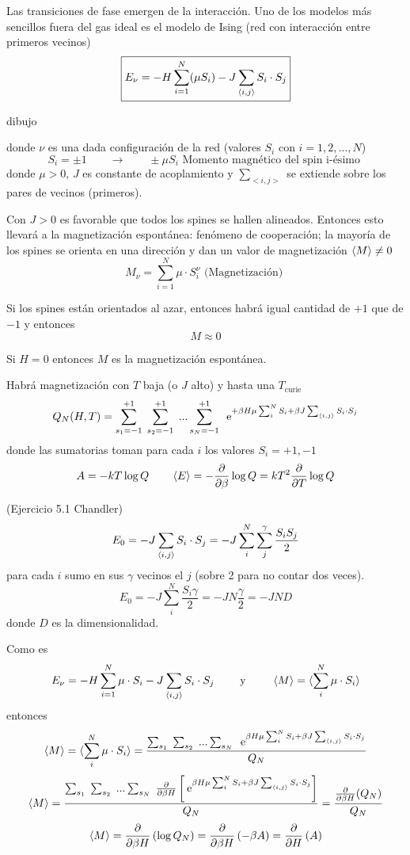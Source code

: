 \documentclass[10pt,oneside]{CBFT_book}
\begin{document}
Las transiciones de fase emergen de la interacción. Uno de los modelos más sencillos fuera del gas ideal es el modelo de
Ising (red con interacción entre primeros vecinos)
\[
	\boxed{ E_\nu = -H \sum_{i=1}^N (\mu S_i) - J \sum_{\braket{i,j}} S_i \cdot S_j }
	\label{energia_ising}
\]

dibujo 


donde $\nu$ es una dada configuración de la red (valores $S_i$ con $i=1,2,...,N$)
\[
	S_i = \pm 1 \qquad \rightarrow \qquad \pm \mu S_i \text{ Momento magnético del spin i-ésimo }
\]
donde $\mu>0$, $J$ es constante de acoplamiento y $\sum_{<i,j>}$ se extiende sobre los pares de vecinos (primeros).

Con $J>0$ es favorable que todos los spines se hallen alineados. Entonces esto llevará a la magnetización espontánea: 
fenómeno de cooperación; la mayoría de los spines se orienta en una dirección y dan un valor de magnetización 
$\braket{M} \neq 0$
\[
	M_\nu = \sum_{i=1}^N \mu \cdot S_i^\nu
	\text{ (Magnetización) }
\]

Si los spines están orientados al azar, entonces habrá igual cantidad de $+1$ que de $-1$ y entonces
\[
	M \approx 0
\]

Si $H=0$ entonces $M$ es la magnetización espontánea.

Habrá magnetización con $T$ baja (o $J$ alto) y hasta una $T_\text{curie}$
\[
	Q_N(H,T) = \sum_{s_1=-1}^{+1} \; \sum_{s_2=-1}^{+1} \; ... \sum_{s_N=-1}^{+1} \;
	\:\mathrm{e}^{ +\beta H \mu \sum_i^N S_i + \beta J \sum_{\braket{i,j}} S_i \cdot S_j }
\]
donde las sumatorias toman para cada $i$ los valores $S_i = +1, -1$
\[
	A = -kT\log Q \qquad \braket{E} = -\frac{\partial^{\hspace{-0.05em}} {}}{\partial {\beta}^{\hspace{-0.05em}}}\log Q = kT^2 \frac{\partial^{\hspace{-0.05em}} {}}{\partial {T}^{\hspace{-0.05em}}} \log Q
\]

\begin{ejemplillo}{(Ejercicio 5.1 Chandler)}
\[
	E_0 = -J \sum_{\braket{i,j}} S_i \cdot S_j = -J  \sum_i^N \sum_j^\gamma \frac{S_i S_j}{2}
\]
para cada $i$ sumo en sus $\gamma$ vecinos el $j$ (sobre 2 para no contar dos veces).
\[
	E_0 = -J \sum_i^N \frac{S_i\gamma}{2} = -J N\frac{\gamma}{2} = -JND
\]
donde $D$ es la dimensionalidad.
\end{ejemplillo}


Como es
\[
	E_\nu =  -H \sum_{i=1}^N \mu \cdot S_i - J \sum_{\braket{i,j}} S_i \cdot S_j \qquad
	\text{ y } \qquad \braket{M} = \braket{ \sum_i^N \mu \cdot S_i }
\]
entonces
\[
	\braket{M} = \braket{ \sum_i^N \mu \cdot S_i } = 
	\frac{ \sum_{s_1} \; \sum_{s_2} \; ... \sum_{s_N} \;
	\:\mathrm{e}^{ \beta H \mu \sum_i^N S_i + \beta J \sum_{\braket{i,j}} S_i \cdot S_j } }{Q_N}
\]
\[
	\braket{M} = \frac{ \sum_{s_1} \; \sum_{s_2} \; ... \sum_{s_N} \;
	\frac{\partial^{\hspace{-0.05em}} {}}{\partial {\beta H}^{\hspace{-0.05em}}} \left[ \:\mathrm{e}^{ \beta H \mu \sum_i^N S_i + \beta J \sum_{\braket{i,j}} S_i \cdot S_j } 
	\right]}{Q_N} = \frac{\frac{\partial^{\hspace{-0.05em}} {}}{\partial {\beta H}^{\hspace{-0.05em}}}(Q_N)}{Q_N}
\]
\[
	\braket{M} = \frac{\partial^{\hspace{-0.05em}} {}}{\partial {\beta H}^{\hspace{-0.05em}}}\left( \log Q_N \right) = \frac{\partial^{\hspace{-0.05em}} {}}{\partial {\beta H}^{\hspace{-0.05em}}}\left( -\beta A \right) =
	\frac{\partial^{\hspace{-0.05em}} {}}{\partial {H}^{\hspace{-0.05em}}}\left( A \right)
\]
\end{document}
